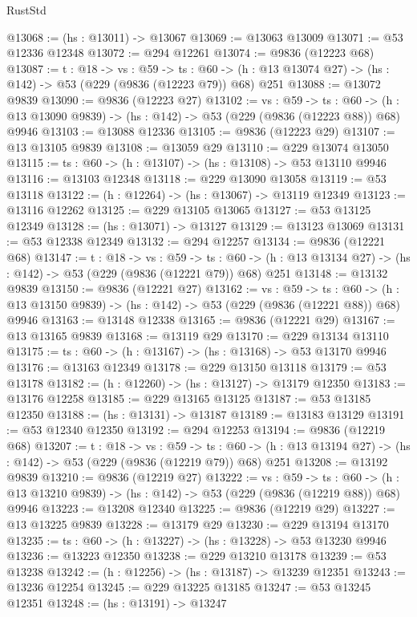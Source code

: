 \begin{lexlean}{RustStd}
\begin{coremodule}
@13068 := (hs : @13011) -> @13067
@13069 := @13063 @13009
@13071 := @53 @12336 @12348
@13072 := @294 @12261
@13074 := @9836 (@12223 @68)
@13087 := {t : @18} ->
  {vs : @59} ->
  {ts : @60} -> (h : @13 @13074 @27) -> (hs : @142) -> @53 (@229 (@9836 (@12223 @79)) @68) @251
@13088 := @13072 @9839
@13090 := @9836 (@12223 @27)
@13102 := {vs : @59} ->
  {ts : @60} -> (h : @13 @13090 @9839) -> (hs : @142) -> @53 (@229 (@9836 (@12223 @88)) @68) @9946
@13103 := @13088 @12336
@13105 := @9836 (@12223 @29)
@13107 := @13 @13105 @9839
@13108 := @13059 @29
@13110 := @229 @13074 @13050
@13115 := {ts : @60} -> (h : @13107) -> (hs : @13108) -> @53 @13110 @9946
@13116 := @13103 @12348
@13118 := @229 @13090 @13058
@13119 := @53 @13118
@13122 := (h : @12264) -> (hs : @13067) -> @13119 @12349
@13123 := @13116 @12262
@13125 := @229 @13105 @13065
@13127 := @53 @13125 @12349
@13128 := (hs : @13071) -> @13127
@13129 := @13123 @13069
@13131 := @53 @12338 @12349
@13132 := @294 @12257
@13134 := @9836 (@12221 @68)
@13147 := {t : @18} ->
  {vs : @59} ->
  {ts : @60} -> (h : @13 @13134 @27) -> (hs : @142) -> @53 (@229 (@9836 (@12221 @79)) @68) @251
@13148 := @13132 @9839
@13150 := @9836 (@12221 @27)
@13162 := {vs : @59} ->
  {ts : @60} -> (h : @13 @13150 @9839) -> (hs : @142) -> @53 (@229 (@9836 (@12221 @88)) @68) @9946
@13163 := @13148 @12338
@13165 := @9836 (@12221 @29)
@13167 := @13 @13165 @9839
@13168 := @13119 @29
@13170 := @229 @13134 @13110
@13175 := {ts : @60} -> (h : @13167) -> (hs : @13168) -> @53 @13170 @9946
@13176 := @13163 @12349
@13178 := @229 @13150 @13118
@13179 := @53 @13178
@13182 := (h : @12260) -> (hs : @13127) -> @13179 @12350
@13183 := @13176 @12258
@13185 := @229 @13165 @13125
@13187 := @53 @13185 @12350
@13188 := (hs : @13131) -> @13187
@13189 := @13183 @13129
@13191 := @53 @12340 @12350
@13192 := @294 @12253
@13194 := @9836 (@12219 @68)
@13207 := {t : @18} ->
  {vs : @59} ->
  {ts : @60} -> (h : @13 @13194 @27) -> (hs : @142) -> @53 (@229 (@9836 (@12219 @79)) @68) @251
@13208 := @13192 @9839
@13210 := @9836 (@12219 @27)
@13222 := {vs : @59} ->
  {ts : @60} -> (h : @13 @13210 @9839) -> (hs : @142) -> @53 (@229 (@9836 (@12219 @88)) @68) @9946
@13223 := @13208 @12340
@13225 := @9836 (@12219 @29)
@13227 := @13 @13225 @9839
@13228 := @13179 @29
@13230 := @229 @13194 @13170
@13235 := {ts : @60} -> (h : @13227) -> (hs : @13228) -> @53 @13230 @9946
@13236 := @13223 @12350
@13238 := @229 @13210 @13178
@13239 := @53 @13238
@13242 := (h : @12256) -> (hs : @13187) -> @13239 @12351
@13243 := @13236 @12254
@13245 := @229 @13225 @13185
@13247 := @53 @13245 @12351
@13248 := (hs : @13191) -> @13247

\end{coremodule}
\end{lexlean}
